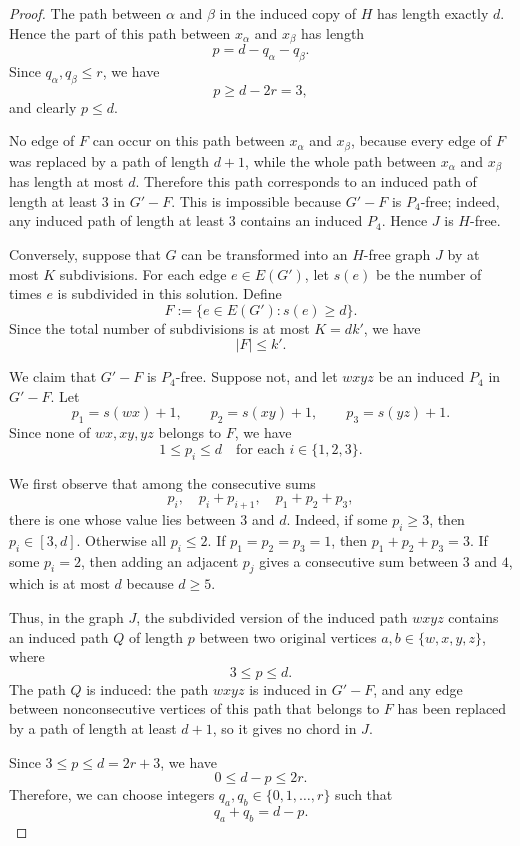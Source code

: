 \documentclass[a4paper,UKenglish,cleveref, autoref, thm-restate]{lipics-v2021}
\begin{document}
\begin{proof}
The path between $\alpha$ and $\beta$ in the induced copy of $H$ has length
exactly $d$.  Hence the part of this path between $x_\alpha$ and $x_\beta$ has
length
\[
    p=d-q_\alpha-q_\beta .
\]
Since $q_\alpha,q_\beta\leq r$, we have
\[
    p\geq d-2r=3,
\]
and clearly $p\leq d$.

No edge of $F$ can occur on this path between $x_\alpha$ and $x_\beta$, because
every edge of $F$ was replaced by a path of length $d+1$, while the whole path
between $x_\alpha$ and $x_\beta$ has length at most $d$.  Therefore this path
corresponds to an induced path of length at least $3$ in $G'-F$.  This is
impossible because $G'-F$ is $P_4$-free; indeed, any induced path of length at
least $3$ contains an induced $P_4$.  Hence $J$ is $H$-free.

Conversely, suppose that $G$ can be transformed into an $H$-free graph $J$ by
at most $K$ subdivisions.  For each edge $e\in E(G')$, let $s(e)$ be the number
of times $e$ is subdivided in this solution.  Define
\[
    F:=\{e\in E(G') : s(e)\geq d\}.
\]
Since the total number of subdivisions is at most $K=dk'$, we have
\[
    |F|\leq k'.
\]

We claim that $G'-F$ is $P_4$-free.  Suppose not, and let $wxyz$ be an induced
$P_4$ in $G'-F$.  Let
\[
    p_1=s(wx)+1,\qquad p_2=s(xy)+1,\qquad p_3=s(yz)+1.
\]
Since none of $wx,xy,yz$ belongs to $F$, we have
\[
    1\leq p_i\leq d
    \quad\text{for each }i\in\{1,2,3\}.
\]

We first observe that among the consecutive sums
\[
    p_i,\quad p_i+p_{i+1},\quad p_1+p_2+p_3,
\]
there is one whose value lies between $3$ and $d$.  Indeed, if some
$p_i\geq 3$, then $p_i\in[3,d]$.  Otherwise all $p_i\leq 2$.  If
$p_1=p_2=p_3=1$, then $p_1+p_2+p_3=3$.  If some $p_i=2$, then adding an
adjacent $p_j$ gives a consecutive sum between $3$ and $4$, which is at most
$d$ because $d\geq 5$.

Thus, in the graph $J$, the subdivided version of the induced path $wxyz$
contains an induced path $Q$ of length $p$ between two original vertices
$a,b\in\{w,x,y,z\}$, where
\[
    3\leq p\leq d.
\]
The path $Q$ is induced: the path $wxyz$ is induced in $G'-F$, and any edge
between nonconsecutive vertices of this path that belongs to $F$ has been
replaced by a path of length at least $d+1$, so it gives no chord in $J$.

Since $3\leq p\leq d=2r+3$, we have
\[
    0\leq d-p\leq 2r.
\]
Therefore, we can choose integers $q_a,q_b\in\{0,1,\ldots,r\}$ such that
\[
    q_a+q_b=d-p.
\]


\end{proof}
\end{document}
